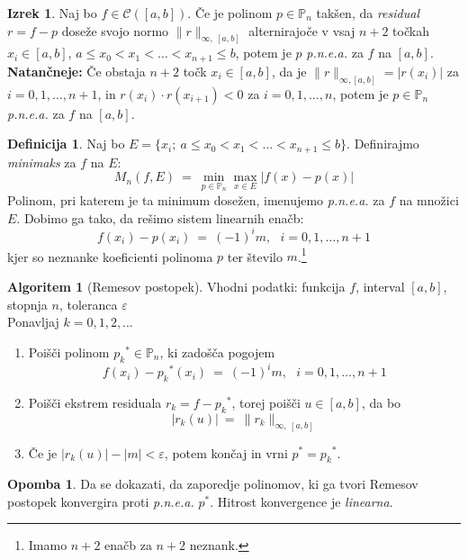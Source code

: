 \documentclass[11pt]{article}
\newcommand{\p}{\mathbb{P}}
\newcommand{\C}{\mathcal{C}}
\theoremstyle{definition}
\newtheorem{definicija}{Definicija}[section]
\theoremstyle{definition}
\newtheorem{izrek}{Izrek}[section]
\newtheorem*{algoritem}{Algoritem}
\newtheorem*{opomba}{Opomba}
\begin{document}
\begin{izrek}

Naj bo $f \in \C([a, b])$. Če je polinom $p \in \p_n$ takšen, da \textit{residual} $r = f - p$ doseže svojo normo $\|r\|_{\infty,~[a, b]}$ alternirajoče v vsaj $n+2$ točkah $x_i \in [a, b]$, $a \leq x_0 < x_1 < \ldots < x_{n+1} \leq b$, potem je $p$ \textit{p.n.e.a.} za $f$ na $[a, b]$. \\

\textbf{Natančneje:} Če obstaja $n+2$ točk $x_i \in [a, b]$, da je $\|r\|_{\infty, [a, b]} = |r(x_i)|$ za $i = 0, 1, \ldots, n+1$, in $r(x_i) \cdot r(x_{i+1}) < 0$ za $i = 0, 1, \ldots, n$, potem je $p \in \p_n$ \textit{p.n.e.a.} za $f$ na $[a, b]$.

\end{izrek}
\vspace{0.5cm}

\begin{definicija}

Naj bo $E = \{x_i;~a \leq x_0 < x_1 < \ldots < x_{n+1} \leq b\}$. Definirajmo \textit{minimaks} za $f$ na $E$:
$$M_n(f, E) ~=~ \min_{p \in \p_n} \max_{x \in E} |f(x) - p(x)|$$
Polinom, pri katerem je ta minimum dosežen, imenujemo \textit{p.n.e.a.} za $f$ na množici $E$. Dobimo ga tako, da rešimo sistem linearnih enačb:
$$f(x_i) - p(x_i) ~=~ (-1)^i m, ~~~i = 0, 1, \ldots, n+1$$
kjer so neznanke koeficienti polinoma $p$ ter število $m$.\footnote{Imamo $n+2$ enačb za $n+2$ neznank.}

\pagebreak

\begin{algoritem}[Remesov postopek]

Vhodni podatki: funkcija $f$, interval $[a, b]$, stopnja $n$, toleranca $\varepsilon$ \\

Ponavljaj $k = 0, 1, 2, \ldots$
\begin{enumerate}
	\item Poišči polinom ${p_k}^* \in \p_n$, ki zadošča pogojem
	$$f(x_i) - {p_k}^*(x_i) ~=~ (-1)^i m, ~~~ i = 0, 1, \ldots, n+1$$
	
	\item Poišči ekstrem residuala $r_k = f - {p_k}^*$, torej poišči $u \in [a, b]$, da bo
	$$|r_k(u)| ~=~ \|r_k\|_{\infty,~[a, b]}$$
	
	\item Če je $|r_k(u)| - |m| < \varepsilon$, potem končaj in vrni $p^* = {p_k}^*$. 
\end{enumerate}
\end{algoritem}
\vspace{0.5cm}

\begin{opomba}

Da se dokazati, da zaporedje polinomov, ki ga tvori Remesov postopek konvergira proti \textit{p.n.e.a.} $p^*$. Hitrost konvergence je \textit{linearna}.

\end{opomba}
\vspace{0.5cm}

\end{definicija}
\vspace{0.5cm}
\end{document}
